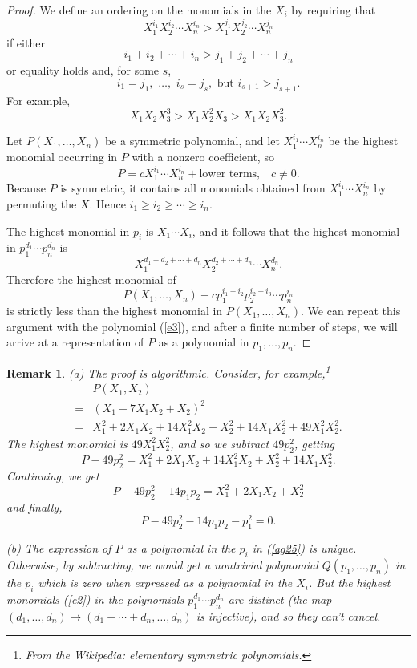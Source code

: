 \documentclass[a4paper,11pt,final,openany]{memoir}
\newtheorem{remark}[X]{Remark}
\theoremstyle{nonumberplain}
\newtheorem{proof}{Proof.}
\begin{document}
\begin{proof}
We define an ordering on the monomials in the $X_{i}$ by requiring that
\[
X_{1}^{i_{1}}X_{2}^{i_{2}}\cdots X_{n}^{i_{n}}>X_{1}^{j_{1}}X_{2}^{j_{2}%
}\cdots X_{n}^{j_{n}}%
\]
if either
\[
i_{1}+i_{2}+\cdots+i_{n}>j_{1}+j_{2}+\cdots+j_{n}%
\]
or equality holds and, for some $s$,
\[
i_{1}=j_{1},\,\,\ldots,\,\,i_{s}=j_{s},\text{\ but }i_{s+1}>j_{s+1}.
\]
For example,
\[
X_{1}X_{2}X_{3}^{3}>X_{1}X_{2}^{2}X_{3}>X_{1}X_{2}X_{3}^{2}.
\]


Let $P(X_{1},\ldots,X_{n})$ be a symmetric polynomial, and let $X_{1}^{i_{1}%
}\cdots X_{n}^{i_{n}}$ be the highest monomial occurring in $P$ with a nonzero
coefficient, so%
\[
P=cX_{1}^{i_{1}}\cdots X_{n}^{i_{n}}+\text{lower terms,}\quad c\neq0.
\]
Because $P$ is symmetric, it contains all monomials obtained from
$X_{1}^{i_{1}}\cdots X_{n}^{i_{n}}$ by permuting the $X$. Hence $i_{1}\geq
i_{2}\geq\cdots\geq i_{n}$.

The highest monomial in $p_{i}$ is $X_{1}\cdots X_{i}$, and it follows that
the highest monomial in $p_{1}^{d_{1}}\cdots p_{n}^{d_{n}}$ is
\begin{equation}
X_{1}^{d_{1}+d_{2}+\cdots+d_{n}}X_{2}^{d_{2}+\cdots+d_{n}}\cdots X_{n}^{d_{n}%
}. \label{e2}%
\end{equation}
Therefore the highest monomial of
\begin{equation}
P(X_{1},\ldots,X_{n})-cp_{1}^{i_{1}-i_{2}}p_{2}^{i_{2}-i_{3}}\cdots
p_{n}^{i_{n}} \label{e3}%
\end{equation}
is strictly less than the highest monomial in $P(X_{1},\ldots,X_{n})$. We can
repeat this argument with the polynomial (\ref{e3}), and after a finite number
of steps, we will arrive at a representation of $P$ as a polynomial in
$p_{1},\ldots,p_{n}$.
\end{proof}

\begin{remark}
\label{ag27a}(a) The proof is algorithmic. Consider, for
example,\footnote{From the Wikipedia: elementary symmetric polynomials.}
\begin{align*}
&P(X_{1},X_{2})  \\
  =&(X_{1}+7X_{1}X_{2}+X_{2})^{2}\\
  =&X_{1}^{2}+2X_{1}X_{2}+14X_{1}^{2}X_{2}+X_{2}^{2}+14X_{1}X_{2}^{2}%
+49X_{1}^{2}X_{2}^{2}.
\end{align*}
\noindent The highest monomial is $49X_{1}^{2}X_{2}^{2}$, and so we subtract
$49p_{2}^{2}$, getting{}%
\[
P-49p_{2}^{2}=X_{1}^{2}+2X_{1}X_{2}+14X_{1}^{2}X_{2}+X_{2}^{2}+14X_{1}%
X_{2}^{2}.
\]
Continuing, we get%
\[
P-49p_{2}^{2}-14p_{1}p_{2}=X_{1}^{2}+2X_{1}X_{2}+X_{2}^{2}%
\]
and finally,%
\[
P-49p_{2}^{2}-14p_{1}p_{2}-p_{1}^{2}=0\text{.}%
\]


(b) The expression of $P$ as a polynomial in the $p_{i}$ in (\ref{ag25}) is
unique. Otherwise, by subtracting, we would get a nontrivial polynomial
$Q(p_{1},\ldots,p_{n})$ in the $p_{i}$ which is zero when expressed as a
polynomial in the $X_{i}$. But the highest monomials (\ref{e2}) in the
polynomials $p_{1}^{d_{1}}\cdots p_{n}^{d_{n}}$ are distinct (the map
$(d_{1},\ldots,d_{n})\mapsto(d_{1}+\cdots+d_{n},\ldots,d_{n})$ is injective),
and so they can't cancel.
\end{remark}
\end{document}
